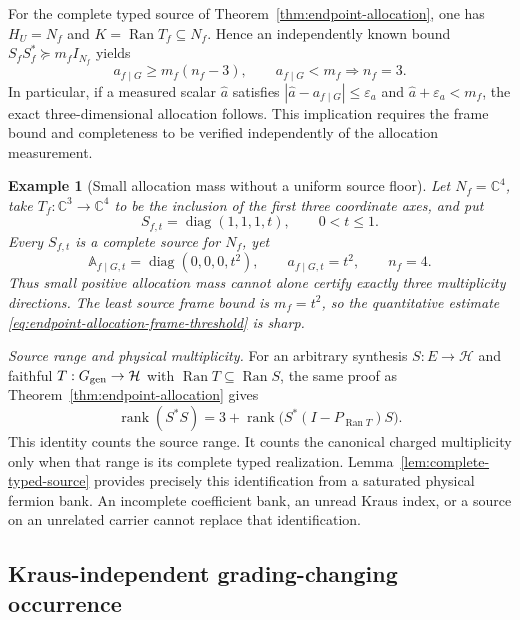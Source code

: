 \documentclass[11pt]{article}
\numberwithin{equation}{section}
\newtheorem{example}[theorem]{Example}
\theoremstyle{definition}
\theoremstyle{remark}
\newcommand{\C}{\mathbb C}
\newcommand{\rank}{\operatorname{rank}}
\newcommand{\Ran}{\operatorname{Ran}}
\newcommand{\diag}{\operatorname{diag}}
\begin{document}
For the complete typed source of
Theorem~\ref{thm:endpoint-allocation}, one has $H_U=N_f$ and
$K=\Ran T_f\subseteq N_f$.  Hence an independently known bound
$S_fS_f^*\succeq m_fI_{N_f}$ yields
\begin{equation}
 a_{f\mid G}\ge m_f(n_f-3),\qquad
 a_{f\mid G}<m_f\Longrightarrow n_f=3.
 \label{eq:endpoint-allocation-frame-threshold}
\end{equation}
In particular, if a measured scalar $\widehat a$ satisfies
$|\widehat a-a_{f\mid G}|\le\varepsilon_a$ and
$\widehat a+\varepsilon_a<m_f$, the exact three-dimensional allocation
follows.  This implication requires the frame bound and completeness to be
verified independently of the allocation measurement.

\begin{example}[Small allocation mass without a uniform source floor]
\label{ex:allocation-small-extra-source}
Let $N_f=\C^4$, take
$T_f:\C^3\to\C^4$ to be the inclusion of the first three coordinate axes,
and put
\[
 S_{f,t}=\diag(1,1,1,t),\qquad 0<t\le1.
\]
Every $S_{f,t}$ is a complete source for $N_f$, yet
\begin{equation}
 \mathbb A_{f\mid G,t}=\diag(0,0,0,t^2),\qquad
 a_{f\mid G,t}=t^2,\qquad n_f=4.
 \label{eq:allocation-small-extra-source}
\end{equation}
Thus small positive allocation mass cannot alone certify exactly three
multiplicity directions.  The least source frame bound is $m_f=t^2$, so the
quantitative estimate \eqref{eq:endpoint-allocation-frame-threshold} is sharp.
\end{example}

\noindent\textit{Source range and physical multiplicity.} For an arbitrary synthesis $S:E\to\mathcal H$ and faithful
$T:G_{\rm gen}\to\mathcal H$ with $\Ran T\subseteq\Ran S$, the same proof
as Theorem~\ref{thm:endpoint-allocation} gives
\[
 \rank(S^*S)
 =3+\rank\bigl(S^*(I-P_{\Ran T})S\bigr).
\]
This identity counts the source range.  It counts the canonical charged
multiplicity only when that range is its complete typed realization.
Lemma~\ref{lem:complete-typed-source} provides precisely this identification
from a saturated physical fermion bank.  An incomplete coefficient bank, an
unread Kraus index, or a source on an unrelated carrier cannot replace that
identification.


\subsection{Kraus-independent grading-changing occurrence}
\label{app:odd-occurrence}
\end{document}
